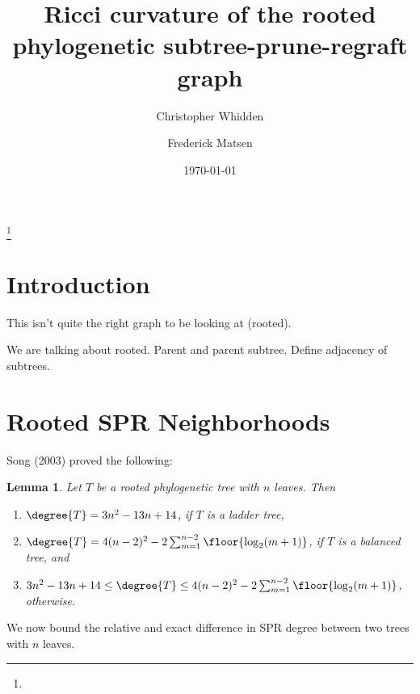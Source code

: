 \documentclass{amsart}
\newtheorem{lemma}[theorem]{Lemma}
\begin{document}
\title{Ricci curvature of the rooted phylogenetic subtree-prune-regraft graph}
\author[Whidden]{Christopher Whidden}
\author[Matsen]{Frederick Matsen}
\address{}
\thanks{}

\date{\today}

\begin{abstract}
\end{abstract}

\maketitle



\section{Introduction}

This isn't quite the right graph to be looking at (rooted).

We are talking about rooted.
Parent and parent subtree.
Define adjacency of subtrees.

\section{Rooted SPR Neighborhoods}

Song (2003) proved the following:

\begin{lemma}
	\label{lem:degree_extremes}
	Let $T$ be a rooted phylogenetic tree with $n$ leaves. Then
	\begin{enumerate}
		\item $\degree{T} = 3n^2 - 13n + 14$, if $T$ is a ladder tree,
		\item $\degree{T} = 4(n-2)^2 - 2 \sum_{m=1}^{n-2} \floor{\log_2(m+1)}$, if $T$ is a balanced tree, and
		\item  $3n^2 - 13n + 14 \le \degree{T} \le 4(n-2)^2 - 2 \sum_{m=1}^{n-2} \floor{\log_2(m+1)}$, otherwise.
	\end{enumerate}
\end{lemma}

We now bound the relative and exact difference in SPR degree between two trees with $n$ leaves.
\end{document}
